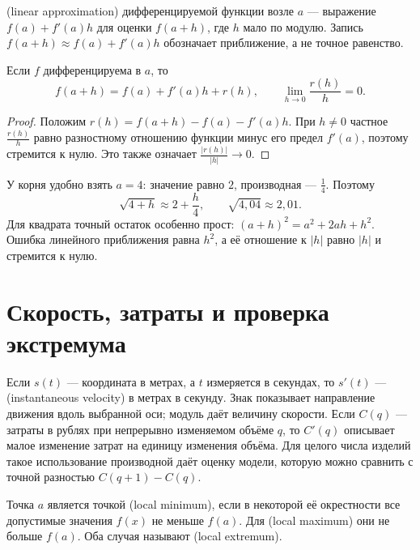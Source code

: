 \begin{definition}
 (linear approximation) дифференцируемой функции возле \(a\) --- выражение \(f(a)+f'(a)h\) для оценки \(f(a+h)\), где \(h\) мало по модулю. Запись \(f(a+h)\approx f(a)+f'(a)h\) обозначает приближение, а не точное равенство.
\end{definition}

\begin{theorem}\label{thm:legacy-c20-5}
Если \(f\) дифференцируема в \(a\), то
\[
f(a+h)=f(a)+f'(a)h+r(h),\qquad
\lim_{h\to0}\frac{r(h)}h=0.
\]
\end{theorem}
\begin{proof}
Положим \(r(h)=f(a+h)-f(a)-f'(a)h\). При \(h\ne0\) частное \(\frac{r(h)}h\) равно разностному отношению функции минус его предел \(f'(a)\), поэтому стремится к нулю. Это также означает \(\frac{|r(h)|}{|h|}\to0\).
\end{proof}

У корня удобно взять \(a=4\): значение равно \(2\), производная --- \(\frac14\). Поэтому
\[
\sqrt{4+h}\approx2+\frac h4,\qquad
\sqrt{4{,}04}\approx2{,}01.
\]
Для квадрата точный остаток особенно прост: \((a+h)^2=a^2+2ah+h^2\). Ошибка линейного приближения равна \(h^2\), а её отношение к \(|h|\) равно \(|h|\) и стремится к нулю.

\section{Скорость, затраты и проверка экстремума}

Если \(s(t)\) --- координата в метрах, а \(t\) измеряется в секундах, то \(s'(t)\) ---  (instantaneous velocity) в метрах в секунду. Знак показывает направление движения вдоль выбранной оси; модуль даёт величину скорости. Если \(C(q)\) --- затраты в рублях при непрерывно изменяемом объёме \(q\), то \(C'(q)\) описывает малое изменение затрат на единицу изменения объёма. Для целого числа изделий такое использование производной даёт оценку модели, которую можно сравнить с точной разностью \(C(q+1)-C(q)\).

\begin{definition}
Точка \(a\) является точкой  (local minimum), если в некоторой её окрестности все допустимые значения \(f(x)\) не меньше \(f(a)\). Для  (local maximum) они не больше \(f(a)\). Оба случая называют  (local extremum).
\end{definition}

